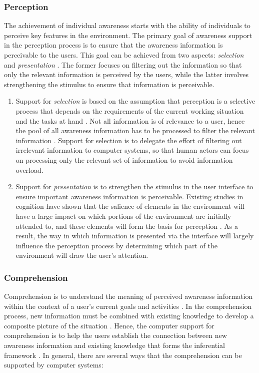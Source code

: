 \subsubsection*{Perception} %
\label{ssub:perception}

The achievement of individual awareness starts with the ability of individuals to perceive key features in the environment. The primary goal of awareness support in the perception process is to ensure that the awareness information is perceivable to the users. This goal can be achieved from two aspects: \emph{selection} and \emph{presentation} \cite{Berlage1999}. The former focuses on filtering out the information so that only the relevant information is perceived by the users, while the latter involves strengthening the stimulus to ensure that information is perceivable.

\begin{enumerate}
	\item Support for \emph{selection} is based on the assumption that perception is a selective process that depends on the requirements of the current working situation and the tasks at hand \cite{Endsley1995}. Not all information is of relevance to a user, hence the pool of all awareness information has to be processed to filter the relevant information \cite{Berlage1999}. Support for selection is to delegate the effort of filtering out irrelevant information to computer systems, so that human actors can focus on processing only the relevant set of information to avoid information overload.
	\item Support for \emph{presentation} is to strengthen the stimulus in the user interface to ensure important awareness information is perceivable. Existing studies in cognition have shown that the salience of elements in the environment will have a large impact on which portions of the environment are initially attended to, and these elements will form the basis for perception \cite{Hegarty2011}. As a result, the way in which information is presented via the interface will largely influence the perception process by determining which part of the environment will draw the user's attention.
\end{enumerate}


\subsubsection*{Comprehension} %
\label{ssub:comprehension}
Comprehension is to understand the meaning of perceived awareness information within the context of a user's current goals and activities \cite{oulasvirta2007a}. In the comprehension process, new information must be combined with existing knowledge to develop a composite picture of the situation \cite{Endsley1995}. Hence, the computer support for comprehension is to help the users establish the connection between new awareness information and existing knowledge that forms the inferential framework \cite{carroll2003a}. In general, there are several ways that the comprehension can be supported by computer systems: 

